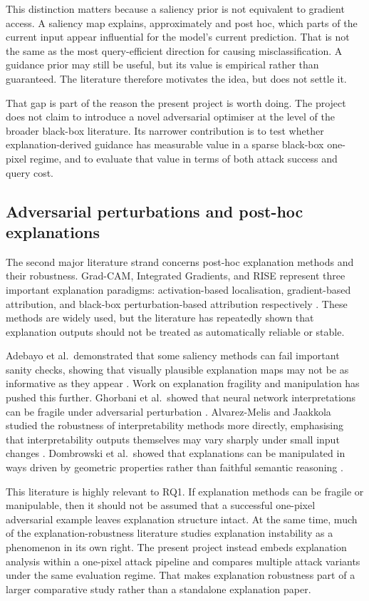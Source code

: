 This distinction matters because a saliency prior is not equivalent to gradient access.
A saliency map explains, approximately and post hoc, which parts of the current input appear influential for the model's current prediction.
That is not the same as the most query-efficient direction for causing misclassification.
A guidance prior may still be useful, but its value is empirical rather than guaranteed.
The literature therefore motivates the idea, but does not settle it.

That gap is part of the reason the present project is worth doing.
The project does not claim to introduce a novel adversarial optimiser at the level of the broader black-box literature.
Its narrower contribution is to test whether explanation-derived guidance has measurable value in a sparse black-box one-pixel regime, and to evaluate that value in terms of both attack success and query cost.

\subsection{Adversarial perturbations and post-hoc explanations}
The second major literature strand concerns post-hoc explanation methods and their robustness.
Grad-CAM, Integrated Gradients, and RISE represent three important explanation paradigms: activation-based localisation, gradient-based attribution, and black-box perturbation-based attribution respectively \cite{selvaraju2017gradcam,sundararajan2017ig,petsiuk2018rise}.
These methods are widely used, but the literature has repeatedly shown that explanation outputs should not be treated as automatically reliable or stable.

Adebayo et al.\ demonstrated that some saliency methods can fail important sanity checks, showing that visually plausible explanation maps may not be as informative as they appear \cite{adebayo2018sanity}.
Work on explanation fragility and manipulation has pushed this further.
Ghorbani et al.\ showed that neural network interpretations can be fragile under adversarial perturbation \cite{ghorbani2019fragile}.
Alvarez-Melis and Jaakkola studied the robustness of interpretability methods more directly, emphasising that interpretability outputs themselves may vary sharply under small input changes \cite{alvarezmelis2018robustness}.
Dombrowski et al.\ showed that explanations can be manipulated in ways driven by geometric properties rather than faithful semantic reasoning \cite{dombrowski2019explanations}.

This literature is highly relevant to RQ1.
If explanation methods can be fragile or manipulable, then it should not be assumed that a successful one-pixel adversarial example leaves explanation structure intact.
At the same time, much of the explanation-robustness literature studies explanation instability as a phenomenon in its own right.
The present project instead embeds explanation analysis within a one-pixel attack pipeline and compares multiple attack variants under the same evaluation regime.
That makes explanation robustness part of a larger comparative study rather than a standalone explanation paper.

